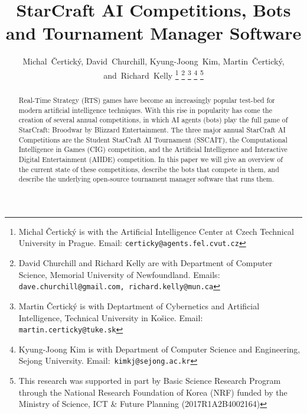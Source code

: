 \documentclass[journal]{IEEEtran}
\begin{document}
\title{StarCraft AI Competitions, Bots\\ and Tournament Manager Software}

\author{Michal~\v{C}ertick\'{y}, David~Churchill, Kyung-Joong~Kim, Martin~\v{C}ertick\'{y}, and~Richard~Kelly%
\thanks{Michal \v{C}ertick\'{y} is with the Artificial Intelligence Center at Czech Technical University in Prague. Email: {\scriptsize \tt{certicky@agents.fel.cvut.cz}}}%
\thanks{David Churchill and Richard Kelly are with Department of Computer Science, Memorial University of Newfoundland. Emails: {\scriptsize\tt{dave.churchill@gmail.com}, \tt{richard.kelly@mun.ca}}}%
\thanks{Martin \v{C}ertick\'{y} is with Deptartment of Cybernetics and Artificial Intelligence, Technical University in Ko\v{s}ice. Email: {\scriptsize \tt{martin.certicky@tuke.sk}}}%
\thanks{Kyung-Joong Kim is with Department of Computer Science and Engineering, Sejong University. Email:~\tt{\scriptsize kimkj@sejong.ac.kr}}
\thanks{This research was supported in part by Basic Science Research Program through the National Research Foundation of Korea (NRF) funded by the Ministry of Science, ICT \& Future Planning (2017R1A2B4002164)}%
}

% 


\maketitle
\begin{abstract}
Real-Time Strategy (RTS) games have become an increasingly popular test-bed for modern artificial intelligence techniques. With this rise in popularity has come the creation of several annual competitions, in which AI agents (bots) play the full game of StarCraft: Broodwar by Blizzard Entertainment. The three major annual StarCraft AI Competitions are the Student StarCraft AI Tournament (SSCAIT), the Computational Intelligence in Games (CIG) competition, and the Artificial Intelligence and Interactive Digital Entertainment (AIIDE) competition. In this paper we will give an overview of the current state of these competitions, describe the bots that compete in them, and describe the underlying open-source tournament manager software that runs them. 
\end{abstract}
\end{document}
